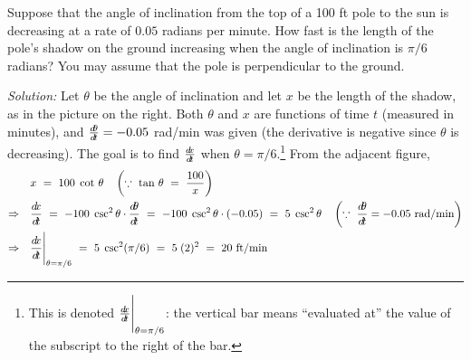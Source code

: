 \begin{exmp}\label{exmp:relrate2}
\noindent Suppose that the angle of inclination from the top of a 100 ft pole
to the sun is decreasing at a rate of $0.05$ radians per minute. How fast is the
length of the pole's shadow on the ground increasing when the angle of
inclination is $\pi/6$ radians? You may assume that the pole is perpendicular to
the ground.\vspace{1mm}
\par\noindent\emph{Solution:} Let $\theta$ be the angle of inclination and let
$x$ be the length of the shadow, as in the picture on the right. Both $\theta$
and $x$ are functions of time $t$ (measured in minutes), and
$\frac{d\negmedspace\theta}{d\!t} = -0.05$ rad/min was given (the derivative is
negative since $\theta$ is decreasing). The goal is to find $\frac{d\negmedspace x}{d\!t}$ when
$\theta = \pi/6$.\footnote{This is denoted $\frac{d\negmedspace x}{d\!t}\Biggr|_{\theta=\pi/6}$: the vertical bar
means ``evaluated at'' the value of the subscript to the right of the bar.}
From the adjacent figure,
\begin{align*}
&x ~=~ 100\;\cot\,\theta \quad\left(\because~ \tan\,\theta ~=~ \frac{100}{x}\right)\\
\Rightarrow\quad &\dxdt ~=~ -100\;\csc^2\theta \cdot
\frac{d\negmedspace\theta}{\dt} ~=~ -100\;\csc^2\theta \cdot (-0.05)
~=~ 5\;\csc^2\theta \quad\left(\because~
\frac{d\negmedspace\theta}{\dt} = -0.05~\text{rad/min}\right)\\
\Rightarrow\quad &\dxdt\Biggr|_{\theta=\pi/6} ~=~ 5\;\csc^2(\pi/6) ~=~ 5\;(2)^2 ~=~ 20~\text{ft/min}
\end{align*}
\end{exmp}
\divider
\newpage
